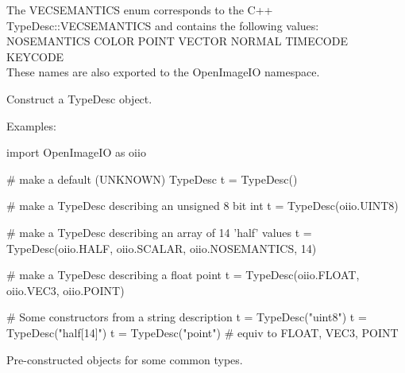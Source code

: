 The {\cf VECSEMANTICS} enum corresponds to the C++ {\cf TypeDesc::VECSEMANTICS} and
contains the following values: \\
{\cf NOSEMANTICS COLOR POINT VECTOR NORMAL TIMECODE KEYCODE} \\
These names are also exported to the {\cf OpenImageIO} namespace.
\apiend


Construct a {\cf TypeDesc} object.  

\noindent Examples:
\begin{code}
    import OpenImageIO as oiio

    # make a default (UNKNOWN) TypeDesc
    t = TypeDesc()

    # make a TypeDesc describing an unsigned 8 bit int
    t = TypeDesc(oiio.UINT8)

    # make a TypeDesc describing an array of 14 'half' values
    t = TypeDesc(oiio.HALF, oiio.SCALAR, oiio.NOSEMANTICS, 14)

    # make a TypeDesc describing a float point
    t = TypeDesc(oiio.FLOAT, oiio.VEC3, oiio.POINT)

    # Some constructors from a string description
    t = TypeDesc("uint8")
    t = TypeDesc("half[14]")
    t = TypeDesc("point")     # equiv to FLOAT, VEC3, POINT
\end{code}
\apiend

Pre-constructed \TypeDesc objects for some common types.

